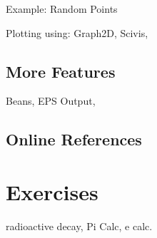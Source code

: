 Example: Random Points

Plotting using: Graph2D, Scivis,


\subsection{More Features}
\label{sec:features}
Beans, EPS Output,

\subsection{Online References}
\label{sec:Online_Refernces}


\section{Exercises}
radioactive decay, Pi Calc, e calc.






